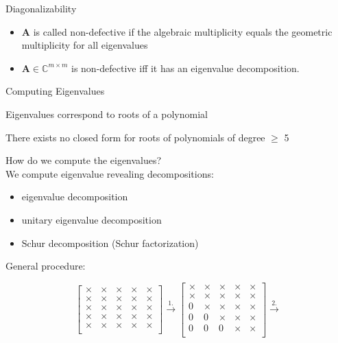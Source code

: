 \documentclass{beamer}
\newcommand{\bvec}[1]{\mathbf{#1}}
\newcommand{\vA}{\bvec{A}}
\newcommand{\bitem}{\item[$\bullet$]}
\begin{document}
\begin{frame}{Diagonalizability}

\begin{itemize}
    \bitem  $\vA$ is called non-defective if the algebraic multiplicity equals the geometric multiplicity for all eigenvalues
    \bitem $\vA \in \mathbb{C}^{m \times m}$ is non-defective iff it has an eigenvalue decomposition.
\end{itemize}

\end{frame}

\begin{frame}{Computing Eigenvalues}

Eigenvalues correspond to roots of a polynomial\vspace{-2mm}
\begin{center}
    There exists no closed form for roots of polynomials of degree $\geq$ 5
\end{center}
How do we compute the eigenvalues?\\
\pause
We compute eigenvalue revealing decompositions:
\begin{itemize}
    \bitem eigenvalue decomposition
    \bitem unitary eigenvalue decomposition
    \bitem Schur decomposition (Schur factorization)
\end{itemize}
\pause
General procedure:
\begin{footnotesize}
\begin{equation*}
\begin{bmatrix}
\times & \times & \times & \times & \times \\
\times & \times & \times & \times & \times \\
\times & \times & \times & \times & \times \\
\times & \times & \times & \times & \times \\
\times & \times & \times & \times & \times \\
\end{bmatrix}
\overset{1.}{\longrightarrow}
\begin{bmatrix}
\times & \times & \times & \times & \times \\
\times & \times & \times & \times & \times \\
0 & \times & \times & \times & \times \\
0 & 0 & \times & \times & \times \\
0 & 0 & 0 & \times & \times \\
\end{bmatrix}
\overset{2.}{\longrightarrow}

\end{equation*}
\end{footnotesize}
\end{frame}
\end{document}
